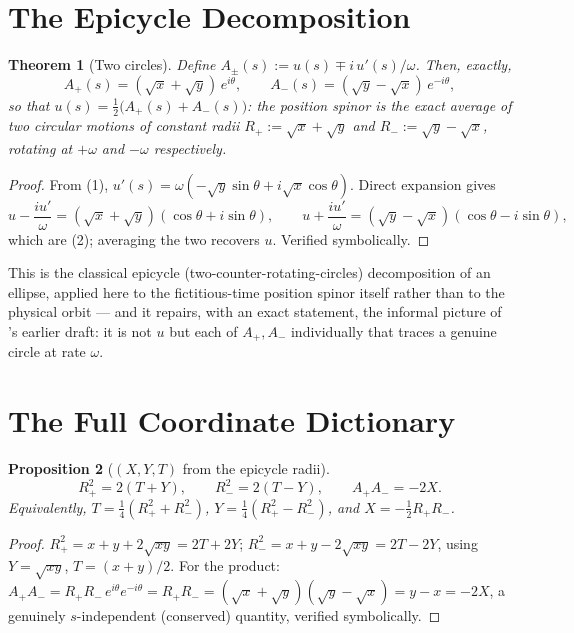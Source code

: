 \documentclass[12pt]{amsart}
\theoremstyle{plain}
\newtheorem{theorem}{Theorem}[section]
\newtheorem{proposition}[theorem]{Proposition}
\theoremstyle{remark}
\begin{document}
\section{The Epicycle Decomposition}

\begin{theorem}[Two circles]\label{thm:epicycle}
Define $A_\pm(s):=u(s)\mp i\,u'(s)/\omega$. Then, exactly,
\begin{equation}
A_+(s)=(\sqrt x+\sqrt y)\,e^{i\theta}, \qquad A_-(s)=(\sqrt y-\sqrt x)\,e^{-i\theta}, \tag{2}
\end{equation}
so that $u(s)=\tfrac12\big(A_+(s)+A_-(s)\big)$: the position spinor is the exact average of two circular motions of constant radii $R_+:=\sqrt x+\sqrt y$ and $R_-:=\sqrt y-\sqrt x$, rotating at $+\omega$ and $-\omega$ respectively.
\end{theorem}

\begin{proof}
From (1), $u'(s)=\omega(-\sqrt y\sin\theta+i\sqrt x\cos\theta)$. Direct expansion gives
\[
u-\frac{iu'}{\omega}=(\sqrt x+\sqrt y)(\cos\theta+i\sin\theta), \qquad u+\frac{iu'}{\omega}=(\sqrt y-\sqrt x)(\cos\theta-i\sin\theta),
\]
which are (2); averaging the two recovers $u$. Verified symbolically. \qedhere
\end{proof}

This is the classical epicycle (two-counter-rotating-circles) decomposition of an ellipse, applied here to the fictitious-time position spinor itself rather than to the physical orbit --- and it repairs, with an exact statement, the informal picture of \cite{Ebert2026LeviCivita}'s earlier draft: it is not $u$ but each of $A_+,A_-$ individually that traces a genuine circle at rate $\omega$.

\section{The Full Coordinate Dictionary}

\begin{proposition}[$(X,Y,T)$ from the epicycle radii]\label{prop:dictionary}
\begin{equation}
R_+^2=2(T+Y), \qquad R_-^2=2(T-Y), \qquad A_+A_-=-2X. \tag{3}
\end{equation}
Equivalently, $T=\tfrac14(R_+^2+R_-^2)$, $Y=\tfrac14(R_+^2-R_-^2)$, and $X=-\tfrac12R_+R_-$.
\end{proposition}

\begin{proof}
$R_+^2=x+y+2\sqrt{xy}=2T+2Y$; $R_-^2=x+y-2\sqrt{xy}=2T-2Y$, using $Y=\sqrt{xy}$, $T=(x+y)/2$. For the product: $A_+A_-=R_+R_-\,e^{i\theta}e^{-i\theta}=R_+R_-=(\sqrt x+\sqrt y)(\sqrt y-\sqrt x)=y-x=-2X$, a genuinely $s$-independent (conserved) quantity, verified symbolically. \qedhere
\end{proof}
\end{document}
